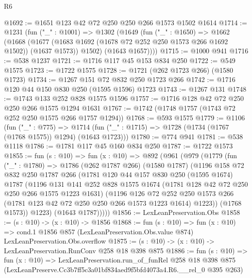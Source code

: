 \begin{lexlean}{R6}
\begin{coremodule}
@1692 := @1651 @123 @42 @72 @250 @250 @266 @1573 @1502 @1614
@1714 := @1231
    (fun ("_" : @1001) =>
    @1302
      (@1649
        (fun ("_" : @1650) =>
        @1662
          (@1668
            (@1677 (@1683 @1692 (@1678 @72 @252 @250 @1573 @266 @1692 @1502)) (@1637 @1573))
            @1502)
          (@1643 @1657))))
@1715 := @1000 @941
@1716 := @538 @1237
@1721 := @1716 @117 @45 @153 @834 @250
@1722 := @549 @1575
@1723 := @1722 @1575
@1728 := @1721 (@262 @1723 @266) (@1580 @1723)
@1734 := @1267 @151 @72 @832 @250 @1723 @266
@1742 := @1716 @120 @44 @150 @830 @250 (@1595 @1596) @1723
@1743 := @1267 @131
@1748 := @1743 @133 @252 @828 @1575 @1596
@1757 := @1716 @128 @42 @72 @250 @250 @266 @1575 @1294 @1631
@1767 := @1742 (@1748 @1757 (@1743 @72 @252 @250 @1575 @266 @1757 @1294))
@1768 := @593 @1575
@1779 := @1106
    (fun ("_" : @775) =>
    @1714 (fun ("_" : @1715) => @1728 (@1734 (@1767 (@1768 @1575)) @1294) (@1643 @1723)))
@1780 := @774 @941
@1781 := @538 @1118
@1786 := @1781 @117 @45 @160 @834 @250
@1787 := @1722 @1573
@1855 := fun (s : @10) =>
  fun (x : @10) =>
  @892
    (@961
      (@979
        (@1779
          (fun ("_" : @1780) =>
          @1786
            (@262 @1787 @266)
            (@1580 @1787)
            (@1196
              @158
              @72
              @832
              @250
              @1787
              @266
              (@1781
                @120
                @44
                @157
                @830
                @250
                (@1595 @1674)
                @1787
                (@1196
                  @131
                  @141
                  @252
                  @828
                  @1575
                  @1674
                  (@1781 @128 @42 @72 @250 @250 @266 @1575 @1223 @1631)
                  (@1196
                    @126
                    @72
                    @252
                    @250
                    @1573
                    @266
                    (@1781 @123 @42 @72 @250 @250 @266 @1573 @1223 @1614)
                    @1223))
                (@1768 @1573))
              @1223)
            (@1643 @1787)))))
@1856 := LexLeanPreservation.Obs
@1858 := (s : @10) -> (x : @10) -> @1856
@1868 := fun (s : @10) =>
  fun (x : @10) =>
  cond.{1} @1856 @857 (LexLeanPreservation.Obs.value @874) LexLeanPreservation.Obs.overflow
@1875 := (s : @10) -> (x : @10) -> LexLeanPreservation.RunConv @258 @18 @398 @875
@1886 := fun (s : @10) =>
  fun (x : @10) =>
  LexLeanPreservation.run_of_funRel
    @258
    @18
    @398
    @875
    (LexLeanPreserve.Cc3b7ff5c3a01bf834aed9f5bfd4073a4.R6.__rel_0 @395 @263)
\end{coremodule}
\end{lexlean}
